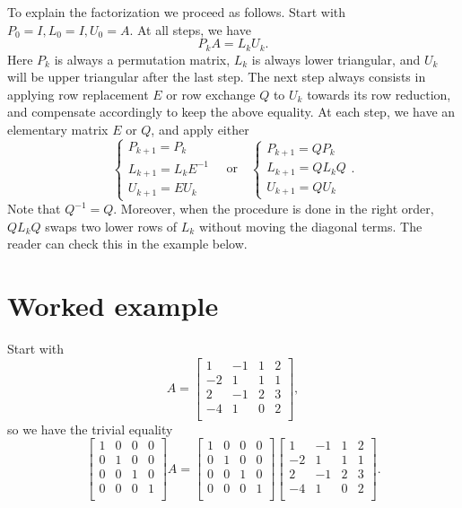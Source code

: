 \documentclass[11pt]{article}
\newcommand{\1}{\mathbf{1}}
\newcommand{\0}{\mathbf{0}}
\begin{document}
To explain the factorization we proceed as follows.
Start with $P_0 = I, L_0 = I, U_0=A$.
At all steps, we have \[P_k A = L_k U_k.\]
Here $P_k$ is always a permutation matrix, $L_k$ is always lower triangular, and $U_k$ will be upper triangular after the last step.
The next step always consists in applying row replacement $E$ or row exchange $Q$ to $U_k$ towards its row reduction, and compensate accordingly to keep the above equality. At each step, we have an elementary matrix $E$ or $Q$, and apply either
\[
\begin{cases}
P_{k+1} = P_k \\
L_{k+1} = L_k E^{-1} \\
U_{k+1} = E U_k
\end{cases}
\quad
\text{or}
\quad
\begin{cases}
P_{k+1} = Q P_k \\
L_{k+1} = Q L_k Q \\
U_{k+1} = Q U_k
\end{cases}
.
\]
Note that $Q^{-1}=Q$.
Moreover, when the procedure is done in the right order, $Q L_k Q$ swaps two lower rows of $L_k$ without moving the diagonal terms.
The reader can check this in the example below.

\section*{Worked example}

Start with
\[
A=
\begin{bmatrix}
  1	& -1	&  1	&  2 \\
 -2	&  1	&  1	&  1 \\
  2	& -1	&  2	&  3 \\
 -4	&  1	&  0	&  2 \\
\end{bmatrix}
,
\]
so we have the trivial equality
\[
\begin{bmatrix}
  1	&  0	&  0	&  0 \\
  0	&  1	&  0	&  0 \\
  0	&  0	&  1	&  0 \\
  0	&  0	&  0	&  1 \\
\end{bmatrix}
A
=
\begin{bmatrix}
  1	&  0	&  0	&  0 \\
  0	&  1	&  0	&  0 \\
  0	&  0	&  1	&  0 \\
  0	&  0	&  0	&  1 \\
\end{bmatrix}
\begin{bmatrix}
  1	& -1	&  1	&  2 \\
 -2	&  1	&  1	&  1 \\
  2	& -1	&  2	&  3 \\
 -4	&  1	&  0	&  2 \\
\end{bmatrix}
.
\]
\end{document}
